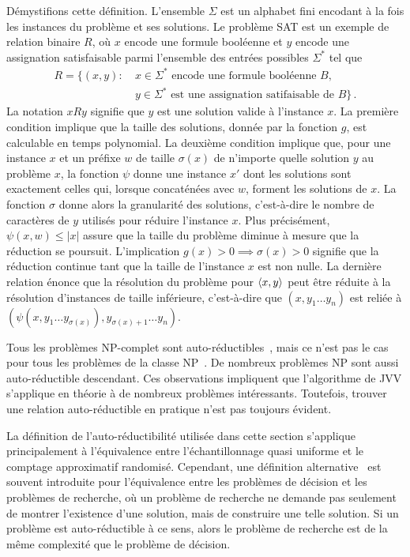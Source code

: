 Démystifions cette définition. L'ensemble $\Sigma$ est un alphabet fini encodant à la fois les instances du problème et ses solutions. Le problème SAT est un exemple de relation binaire $R$, où $x$ encode une formule booléenne et $y$ encode une assignation satisfaisable parmi l'ensemble des entrées possibles $\Sigma^{*}$ tel que
\begin{equation}
    \begin{aligned}
    R = \{ (x,y) : \ & x \in \Sigma^{*} \text{ encode une formule booléenne } B, \\ 
    & y \in \Sigma^{*} \text{ est une assignation satifaisable de } B \} \,.
    \end{aligned}
\end{equation}
La notation $xRy$ signifie que $y$ est une solution valide à l'instance $x$. La première condition implique que la taille des solutions, donnée par la fonction $g$, est calculable en temps polynomial. La deuxième condition implique que, pour une instance $x$ et un préfixe $w$ de taille $\sigma(x)$ de n'importe quelle solution $y$ au problème $x$, la fonction $\psi$ donne une instance $x'$ dont les solutions sont exactement celles qui, lorsque concaténées avec $w$, forment les solutions de $x$. La fonction $\sigma$ donne alors la granularité des solutions, c'est-à-dire le nombre de caractères de $y$ utilisés pour réduire l'instance $x$. Plus précisément, $\psi(x, w) \leq \lvert x \rvert$ assure que la taille du problème diminue à mesure que la réduction se poursuit. L'implication $g(x) > 0 \implies  \sigma(x) > 0$ signifie que la réduction continue tant que la taille de l'instance $x$ est non nulle. La dernière relation énonce que la résolution du problème pour $\braket{x, y}$ peut être réduite à la résolution d'instances de taille inférieure, c'est-à-dire que $(x, y_{1}\dots y_{n})$ est reliée à $(\psi(x, y_{1}\dots y_{\sigma (x)}), y_{\sigma(x)+1}\dots y_{n})$.

Tous les problèmes \textsf{NP}-complet sont auto-réductibles~\cite{goldreichComputationalComplexityConceptual2008}, mais ce n'est pas le cas pour tous les problèmes de la classe \textsf{NP}~\cite{khullerPlanarGraphColoring1991a}. De nombreux problèmes \textsf{NP} sont aussi auto-réductible descendant. Ces observations impliquent que l'algorithme de JVV s'applique en théorie à de nombreux problèmes intéressants. Toutefois, trouver une relation auto-réductible en pratique n'est pas toujours évident.

La définition de l'auto-réductibilité utilisée dans cette section s'applique principalement à l'équivalence entre l'échantillonnage quasi uniforme et le comptage approximatif randomisé. Cependant, une définition alternative~\cite{goldreichComputationalComplexityConceptual2008} est souvent introduite pour l'équivalence entre les problèmes de décision et les problèmes de recherche, où un problème de recherche ne demande pas seulement de montrer l'existence d'une solution, mais de construire une telle solution. Si un problème est auto-réductible à ce sens, alors le problème de recherche est de la même complexité que le problème de décision. 

